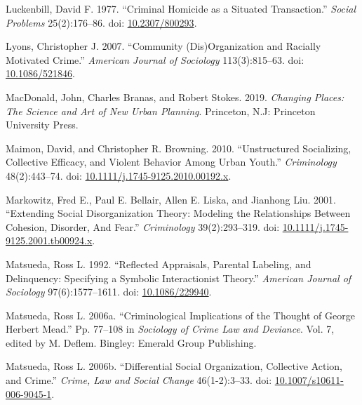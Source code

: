 \documentclass [11pt, proquest] {uwthesis}[2015/03/03]
\newlength{\cslhangindent}
\newenvironment{CSLReferences}[2]%
{\setlength{\parindent}{0pt}%
\everypar{\setlength{\hangindent}{\cslhangindent}}\ignorespaces}%
{\par}
\begin{document}
\begin{CSLReferences}{1}{0}
\leavevmode\hypertarget{ref-luckenbillCriminalHomicideSituated1977}{}%
Luckenbill, David F. 1977. {``Criminal {Homicide} as a {Situated Transaction}.''} \emph{Social Problems} 25(2):176--86. doi: \href{https://doi.org/10.2307/800293}{10.2307/800293}.

\leavevmode\hypertarget{ref-lyonsCommunityDisOrganization2007}{}%
Lyons, Christopher J. 2007. {``Community ({Dis}){Organization} and {Racially Motivated Crime}.''} \emph{American Journal of Sociology} 113(3):815--63. doi: \href{https://doi.org/10.1086/521846}{10.1086/521846}.

\leavevmode\hypertarget{ref-macdonaldChangingPlacesScience2019}{}%
MacDonald, John, Charles Branas, and Robert Stokes. 2019. \emph{Changing {Places}: {The Science} and {Art} of {New Urban Planning}}. {Princeton, N.J}: {Princeton University Press}.

\leavevmode\hypertarget{ref-maimonUnstructuredSocializingCollective2010}{}%
Maimon, David, and Christopher R. Browning. 2010. {``Unstructured {Socializing}, {Collective Efficacy}, and {Violent Behavior} Among {Urban Youth}.''} \emph{Criminology} 48(2):443--74. doi: \href{https://doi.org/10.1111/j.1745-9125.2010.00192.x}{10.1111/j.1745-9125.2010.00192.x}.

\leavevmode\hypertarget{ref-markowitzExtendingSocialDisorganization2001}{}%
Markowitz, Fred E., Paul E. Bellair, Allen E. Liska, and Jianhong Liu. 2001. {``Extending {Social Disorganization Theory}: {Modeling} the {Relationships Between Cohesion}, {Disorder}, {And Fear}.''} \emph{Criminology} 39(2):293--319. doi: \href{https://doi.org/10.1111/j.1745-9125.2001.tb00924.x}{10.1111/j.1745-9125.2001.tb00924.x}.

\leavevmode\hypertarget{ref-matsuedaReflectedAppraisalsParental1992}{}%
Matsueda, Ross L. 1992. {``Reflected {Appraisals}, {Parental Labeling}, and {Delinquency}: {Specifying} a {Symbolic Interactionist Theory}.''} \emph{American Journal of Sociology} 97(6):1577--1611. doi: \href{https://doi.org/10.1086/229940}{10.1086/229940}.

\leavevmode\hypertarget{ref-matsuedaCriminologicalImplicationsThought2006}{}%
Matsueda, Ross L. 2006a. {``Criminological {Implications} of the {Thought} of {George Herbert Mead}.''} Pp. 77--108 in \emph{Sociology of {Crime Law} and {Deviance}}. Vol. 7, edited by M. Deflem. {Bingley}: {Emerald Group Publishing}.

\leavevmode\hypertarget{ref-matsuedaDifferentialSocialOrganization2006}{}%
Matsueda, Ross L. 2006b. {``Differential Social Organization, Collective Action, and Crime.''} \emph{Crime, Law and Social Change} 46(1-2):3--33. doi: \href{https://doi.org/10.1007/s10611-006-9045-1}{10.1007/s10611-006-9045-1}.


\end{CSLReferences}
\end{document}
